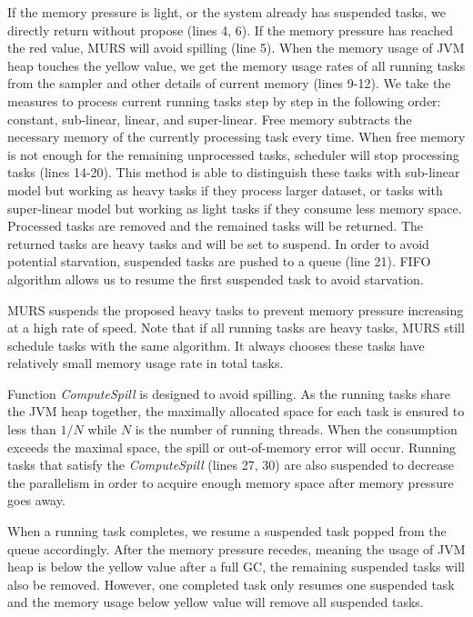 If the memory pressure is light, or the system already has suspended tasks, we directly return without propose (lines 4, 6). If the memory pressure has reached the red value, MURS will avoid spilling (line 5). When the memory usage of JVM heap touches the yellow value, we get the memory usage rates of all running tasks from the sampler and other details of current memory (lines 9-12). We take the measures to process current running tasks step by step in the following order: constant, sub-linear, linear, and super-linear. Free memory subtracts the necessary memory of the currently processing task every time. When free memory is not enough for the remaining unprocessed tasks, scheduler will stop processing tasks (lines 14-20). This method is able to distinguish these tasks with sub-linear model but working as heavy tasks if they process larger dataset, or tasks with super-linear model but working as light tasks if they consume less memory space. Processed tasks are removed and the remained tasks will be returned. The returned tasks are heavy tasks and will be set to suspend. In order to avoid potential starvation, suspended tasks are pushed to a queue (line 21). FIFO algorithm allows us to resume the first suspended task to avoid starvation. 

MURS suspends the proposed heavy tasks to prevent memory pressure increasing at a high rate of speed. Note that if all running tasks are heavy tasks, MURS still schedule tasks with the same algorithm. It always chooses these tasks have relatively small memory usage rate in total tasks. 

Function \textit{ComputeSpill} is designed to avoid spilling. As the running tasks share the JVM heap together, the maximally allocated space for each task is ensured to less than $1/N$ while $N$ is the number of running threads. When the consumption exceeds the maximal space, the spill or out-of-memory error will occur. Running tasks that satisfy the \textit{ComputeSpill} (lines 27, 30) are also suspended to decrease the parallelism in order to acquire enough memory space after memory pressure goes away.   

When a running task completes, we resume a suspended task popped from the queue accordingly. After the memory pressure recedes, meaning the usage of JVM heap is below the yellow value after a full GC, the remaining suspended tasks will also be removed. However, one completed task only resumes one suspended task and the memory usage below yellow value will remove all suspended tasks.

